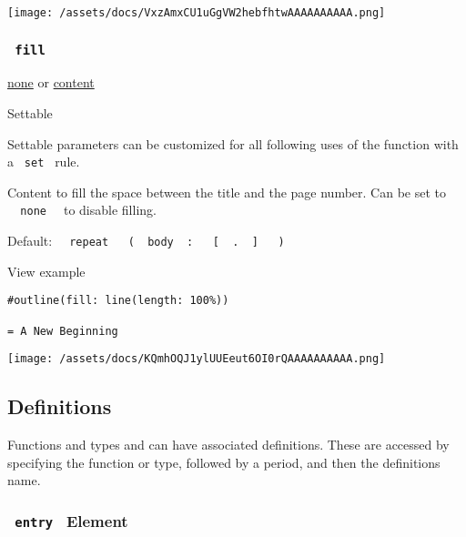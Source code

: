 \texttt{[image: /assets/docs/VxzAmxCU1uGgVW2hebfhtwAAAAAAAAAA.png]}

\subsubsection{\texorpdfstring{\texttt{\ fill\ }}{ fill }}\label{parameters-fill}

\href{/docs/reference/foundations/none/}{none} {or}
\href{/docs/reference/foundations/content/}{content}

{{ Settable }}

\label{parameters-fill-settable-tooltip}
Settable parameters can be customized for all following uses of the
function with a \texttt{\ set\ } rule.

Content to fill the space between the title and the page number. Can be
set to \texttt{\ }{\texttt{\ none\ }}\texttt{\ } to disable filling.

Default:
\texttt{\ }{\texttt{\ repeat\ }}\texttt{\ }{\texttt{\ (\ }}\texttt{\ body\ }{\texttt{\ :\ }}\texttt{\ }{\texttt{\ {[}\ }}\texttt{\ .\ }{\texttt{\ {]}\ }}\texttt{\ }{\texttt{\ )\ }}\texttt{\ }


View example

\begin{verbatim}
#outline(fill: line(length: 100%))

= A New Beginning
\end{verbatim}

\texttt{[image: /assets/docs/KQmhOQJ1ylUUEeut6OI0rQAAAAAAAAAA.png]}

\subsection{\texorpdfstring{{ Definitions
}}{ Definitions }}\label{definitions}

\label{definitions-tooltip}
Functions and types and can have associated definitions. These are
accessed by specifying the function or type, followed by a period, and
then the definition\textquotesingle s name.

\subsubsection{\texorpdfstring{\texttt{\ entry\ } {{ Element
}}}{ entry   Element }}\label{definitions-entry}

